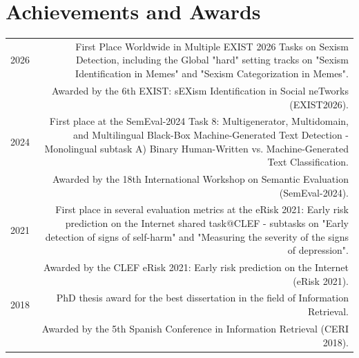 \documentclass[10pt]{article}
\begin{document}
\section*{Achievements and Awards}
\begin{tabular}{L!{\VRule}R}
	2026 &  First Place Worldwide in Multiple EXIST 2026 Tasks on Sexism Detection, including the Global "hard" setting tracks on "Sexism Identification in Memes" and "Sexism Categorization in Memes".\\
    &\scriptsize{Awarded by the 6th EXIST: sEXism Identification in Social neTworks (EXIST2026).}\vspace{5pt}\\
	2024 & First place at the SemEval-2024 Task 8: Multigenerator, Multidomain, and Multilingual Black-Box Machine-Generated Text Detection - Monolingual subtask A) Binary Human-Written vs. Machine-Generated Text Classification.\\\
    &\scriptsize{Awarded by the 18th International Workshop on Semantic Evaluation (SemEval-2024).}\vspace{5pt}\\
	2021 & First place in several evaluation metrics at the eRisk 2021: Early risk prediction on the Internet shared task@CLEF - subtasks on "Early detection of signs of self-harm" and "Measuring the severity of the signs of depression".\\
    &\scriptsize{Awarded by the CLEF eRisk 2021: Early risk prediction on the Internet (eRisk 2021).}\vspace{5pt}\\
	2018 & PhD thesis award for the best dissertation in the field of Information Retrieval.\\
	&\scriptsize{Awarded by the 5th Spanish Conference in Information Retrieval (CERI 2018).}\vspace{5pt}\\
          \end{tabular}
     
\end{document}
